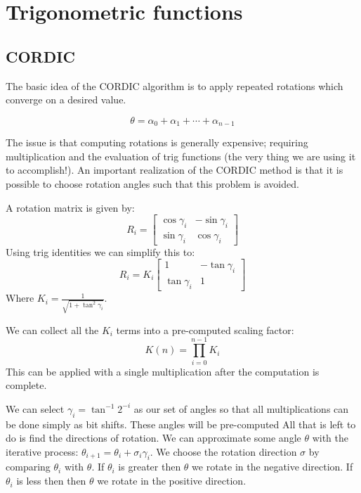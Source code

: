 \section{Trigonometric functions}
    \subsection{CORDIC}

	The basic idea of the CORDIC\cite{V:1959} algorithm is to apply
	repeated rotations which converge on a desired value.

        \[ \theta = \alpha_0 + \alpha_1 + \dotsb + \alpha_{n-1} \]

	The issue is that computing rotations is generally expensive; requiring
	multiplication and the evaluation of trig functions (the very thing we
	are using it to accomplish!). An important realization of the CORDIC
	method is that it is possible to choose rotation angles such that this
	problem is avoided.

        A rotation matrix is given by:
        \[
          R_i = \begin{bmatrix}
            \cos\gamma_i & -\sin\gamma_i \\
            \sin\gamma_i & \cos\gamma_i
          \end{bmatrix}
        \]
        Using trig identities we can simplify this to:
        \[
          R_i = K_i
                \begin{bmatrix}
                  1            & -\tan\gamma_i \\
                  \tan\gamma_i & 1
                \end{bmatrix}
        \]
        Where $K_i = \frac{1}{\sqrt{1+\tan^2\gamma_i}}$.

        We can collect all the $K_i$ terms into a pre-computed scaling factor:
        \[ K(n) = \prod_{i=0}^{n-1}K_i \]
        This can be applied with a single multiplication after the computation is complete.

        We can select $\gamma_i = \tan^{-1}2^{-i}$ as our set of angles so that all multiplications can be done simply as bit shifts.
        These angles will be pre-computed
        All that is left to do is find the directions of rotation.
        We can approximate some angle $\theta$ with the iterative process: $\theta_{i+1} = \theta_i + \sigma_i\gamma_i$.
        We choose the rotation direction $\sigma$ by comparing $\theta_i$ with $\theta$.
        If $\theta_i$ is greater then $\theta$ we rotate in the negative direction.
        If $\theta_i$ is less then then $\theta$ we rotate in the positive direction.


